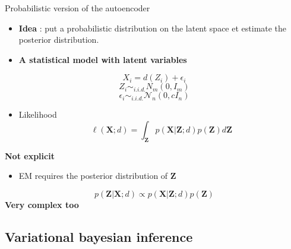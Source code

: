 \documentclass[compress,10pt]{beamer}
\begin{document}

\begin{frame}{Probabilistic version of the autoencoder}
\protect\hypertarget{probabilistic-version-of-the-autoencoder}{}
\begin{itemize}
\item
  \textbf{Idea} : put a probabilistic distribution on the latent space et
  estimate the posterior distribution.
\item
  \textbf{A statistical model with latent variables}
\end{itemize}

\[X_i =d(Z_i) + \epsilon_i\] \[Z_i \sim_{i.i.d.}N_m(0,I_m)\]
\[\epsilon_i \sim_{i.i.d.} \mathcal{N}_n(0,c I_n)\]

\begin{itemize}
\item
  Likelihood
  \[\ell(\mathbf{X}; d)  =  \int_{\mathbf{Z}} p(\mathbf{X} | \mathbf{Z};d)p(\mathbf{Z})d\mathbf{Z}\]
\end{itemize}

\textbf{Not explicit}

\begin{itemize}
\item
  EM requires the posterior distribution of \(\mathbf{Z}\)
\end{itemize}

\[p(\mathbf{Z} | \mathbf{X}; d) \propto p(\mathbf{X}|\mathbf{Z}; d)p(\mathbf{Z}) \]
\textbf{Very complex too}
\end{frame}



\subsection{Variational bayesian inference}
\end{document}
